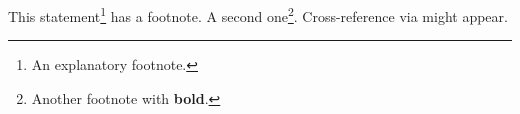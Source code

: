 \documentclass{article}
\begin{document}
This statement\footnote{An explanatory footnote.} has a footnote.
A second one\footnote{Another footnote with \textbf{bold}.}.
Cross-reference via \footnotemark[1]{} might appear.
\end{document}
